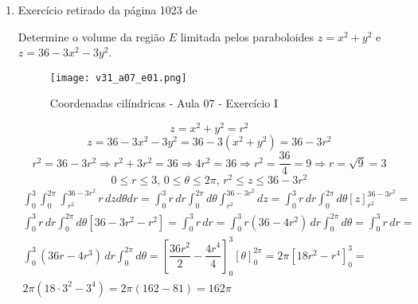 \begin{enumerate}
	\item Exercício retirado da página 1023 de \cite{James_Stewart_calculo_v2}
	
	Determine o volume da região $E$ limitada pelos paraboloides $z = x^2 + y^2$ e $z = 36-3x^2-3y^2$.
	
	\begin{figure}[htb]
		\caption{Coordenadas cilíndricas - Aula 07 - Exercício I}
		\label{v31_a07_e01}
		\centering
		\texttt{[image: v31\_a07\_e01.png]}		
	\end{figure}
	
	\begin{equation*}
		z = x^2 + y^2 = r^2
	\end{equation*}
	\begin{equation*}
		z = 36-3x^2-3y^2 = 36-3\left(x^2 + y^2\right) = 36-3r^2
	\end{equation*}
	\begin{equation*}
		r^2 = 36-3r^2 \Rightarrow r^2 + 3r^2 = 36 \Rightarrow 4r^2 = 36 \Rightarrow r^2 = \dfrac{36}{4} = 9 \Rightarrow r = \sqrt{9} = 3
	\end{equation*}
	\begin{equation*}
		0 \leq r \leq 3,\, 0 \leq \theta \leq 2\pi,\, r^2 \leq z \leq 36-3r^2
	\end{equation*}
	\begin{gather*}
		\int_0^3 \int_0^{2\pi} \int_{r^2}^{36-3r^2} r\, dz d\theta dr = \int_0^3 r\, dr \int_0^{2\pi} d\theta \int_{r^2}^{36-3r^2} dz = \int_0^3 r\, dr \int_0^{2\pi} d\theta \left[z\right]_{r^2}^{36-3r^2} =\\ \int_0^3 r\, dr \int_0^{2\pi} d\theta \left[36-3r^2-r^2\right] = \int_0^3 r\, dr = \int_0^3 r\left(36-4r^2\right)\, dr \int_0^{2\pi} d\theta  = \int_0^3 r\, dr =\\ \int_0^3 \left(36r-4r^3\right)\, dr \int_0^{2\pi} d\theta = \left[\dfrac{36r^2}{2} - \dfrac{4r^4}{4}\right]_0^3 \left[\theta\right]_0^{2\pi} = 2\pi \left[18r^2 - r^4\right]_0^3 =\\ 2\pi \left(18\cdot 3^2 - 3^4\right) = 2\pi\left(162 - 81\right) = 162\pi
	\end{gather*}
\end{enumerate}